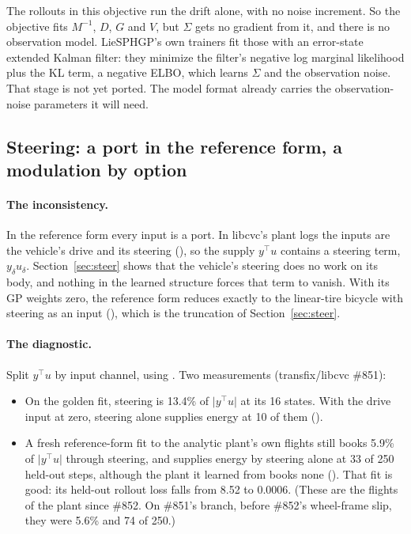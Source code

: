 \documentclass[11pt]{article}
\theoremstyle{remark}
\newcommand{\T}{^{\top}}
\begin{document}
The rollouts in this objective run the drift alone, with no noise increment. So the objective fits
$M^{-1}$, $D$, $G$ and $V$, but $\Sigma$ gets no gradient from it, and there is no observation
model. LieSPHGP's own trainers fit those with an error-state extended Kalman filter: they minimize
the filter's negative log marginal likelihood plus the KL term, a negative ELBO, which learns $\Sigma$
and the observation noise. That stage is not yet ported. The model format already carries the
observation-noise parameters it will need.

\subsection{Steering: a port in the reference form, a modulation by option}
\label{sec:learned-steer}
\paragraph{The inconsistency.} In the reference form every input is a port. In libcvc's plant logs
the inputs are the vehicle's drive and its steering (), so the supply $y\T u$
contains a steering term, $y_\delta u_\delta$. Section~\ref{sec:steer} shows that the vehicle's
steering does no work on its body, and nothing in the learned structure forces that term to
vanish. With its GP weights zero, the reference form reduces exactly to the linear-tire bicycle
with steering as an input (), which is the truncation of
Section~\ref{sec:steer}.

\paragraph{The diagnostic.} Split $y\T u$ by input channel, using . Two measurements
(transfix/libcvc \#851):
\begin{itemize}
  \item On the golden fit, steering is 13.4\% of $\lvert y\T u\rvert$ at its 16 states. With the drive
        input at zero, steering alone supplies energy at 10 of them
        ().
  \item A fresh reference-form fit to the analytic plant's own flights still books 5.9\% of
        $\lvert y\T u\rvert$ through steering, and supplies energy by steering alone at 33 of 250
        held-out steps, although the plant it learned from books none
        (). That fit is good: its held-out rollout
        loss falls from 8.52 to 0.0006. (These are the flights of the plant since \#852. On
        \#851's branch, before \#852's wheel-frame slip, they were 5.6\% and 74 of 250.)
\end{itemize}
\end{document}
